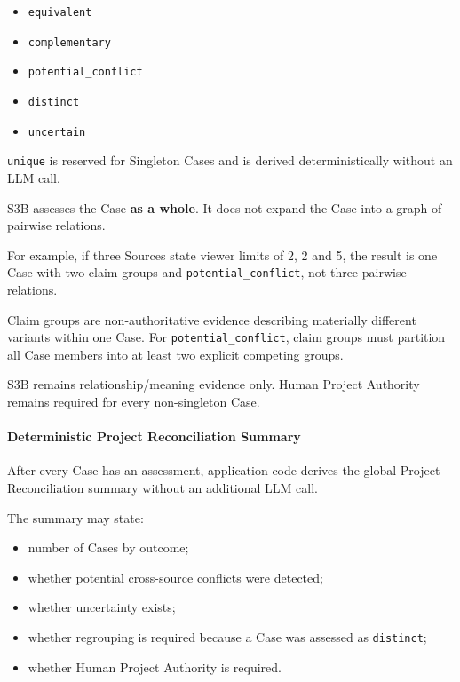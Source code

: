 \begin{itemize}
\tightlist
\item
  \texttt{equivalent}
\item
  \texttt{complementary}
\item
  \texttt{potential\_conflict}
\item
  \texttt{distinct}
\item
  \texttt{uncertain}
\end{itemize}

\texttt{unique} is reserved for Singleton Cases and is derived deterministically without an LLM call.

S3B assesses the Case \textbf{as a whole}. It does not expand the Case into a graph of pairwise relations.

For example, if three Sources state viewer limits of 2, 2 and 5, the result is one Case with two claim groups and \texttt{potential\_conflict}, not three pairwise relations.

Claim groups are non-authoritative evidence describing materially different variants within one Case. For \texttt{potential\_conflict}, claim groups must partition all Case members into at least two explicit competing groups.

S3B remains relationship/meaning evidence only. Human Project Authority remains required for every non-singleton Case.

\hypertarget{deterministic-project-reconciliation-summary}{%
\paragraph{Deterministic Project Reconciliation Summary}\label{deterministic-project-reconciliation-summary}}

After every Case has an assessment, application code derives the global Project Reconciliation summary without an additional LLM call.

The summary may state:

\begin{itemize}
\tightlist
\item
  number of Cases by outcome;
\item
  whether potential cross-source conflicts were detected;
\item
  whether uncertainty exists;
\item
  whether regrouping is required because a Case was assessed as \texttt{distinct};
\item
  whether Human Project Authority is required.
\end{itemize}

